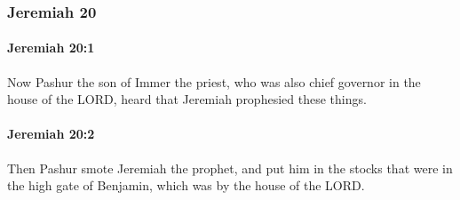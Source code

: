 	\subsubsection{Jeremiah 20} %
		\label{JEREMIAH-20}

		\paragraph{Jeremiah 20:1} %
			\label{JEREMIAH-20-1}

			Now Pashur the son of Immer the priest, who was also chief governor in the house of the LORD, heard that Jeremiah prophesied these things.


		\paragraph{Jeremiah 20:2} %
			\label{JEREMIAH-20-2}

			Then Pashur smote Jeremiah the prophet, and put him in the stocks that were in the high gate of Benjamin, which was by the house of the LORD.

